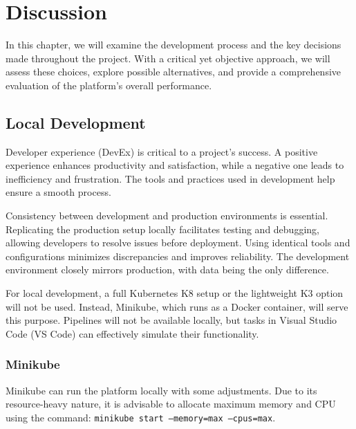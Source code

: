 

\chapter{Discussion}
In this chapter, we will examine the development process and the key decisions made throughout the project. With a critical yet objective approach, we will assess these choices, explore possible alternatives, and provide a comprehensive evaluation of the platform's overall performance.

\section{Local Development}
Developer experience (DevEx) is critical to a project's success. A positive experience enhances productivity and satisfaction, while a negative one leads to inefficiency and frustration. The tools and practices used in development help ensure a smooth process.

Consistency between development and production environments is essential. Replicating the production setup locally facilitates testing and debugging, allowing developers to resolve issues before deployment. Using identical tools and configurations minimizes discrepancies and improves reliability. The development environment closely mirrors production, with data being the only difference.

For local development, a full Kubernetes K8 setup or the lightweight K3 option will not be used. Instead, Minikube, which runs as a Docker container, will serve this purpose. Pipelines will not be available locally, but tasks in Visual Studio Code (VS Code) can effectively simulate their functionality.

\subsection{Minikube}
Minikube can run the platform locally with some adjustments. Due to its resource-heavy nature, it is advisable to allocate maximum memory and CPU using the command: \texttt{minikube start --memory=max --cpus=max}.

